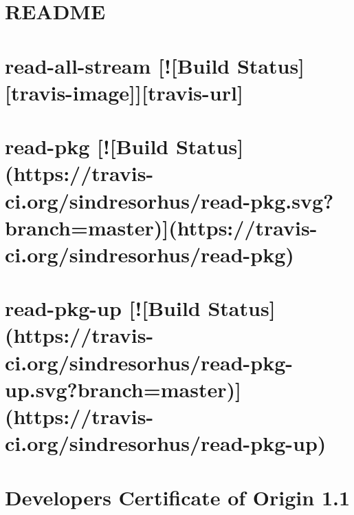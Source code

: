 \documentclass[twoside]{book}
\newcommand{\+}{\discretionary{\mbox{\scriptsize$\hookleftarrow$}}{}{}}
\begin{document}
\chapter{R\+E\+A\+D\+ME}
\label{md__c_1_workspace_demo_src_main_script_node_modules_react-scripts_template__r_e_a_d_m_e}

\chapter{read-\/all-\/stream \mbox{[}!\mbox{[}Build Status\mbox{]}\mbox{[}travis-\/image\mbox{]}\mbox{]}\mbox{[}travis-\/url\mbox{]}}
\label{md__c_1_workspace_demo_src_main_script_node_modules_read-all-stream_readme}

\chapter{read-\/pkg \mbox{[}!\mbox{[}Build Status\mbox{]}(https\+://travis-\/ci.org/sindresorhus/read-\/pkg.svg?branch=master)\mbox{]}(https\+://travis-\/ci.org/sindresorhus/read-\/pkg)}
\label{md__c_1_workspace_demo_src_main_script_node_modules_read-pkg_readme}

\chapter{read-\/pkg-\/up \mbox{[}!\mbox{[}Build Status\mbox{]}(https\+://travis-\/ci.org/sindresorhus/read-\/pkg-\/up.svg?branch=master)\mbox{]}(https\+://travis-\/ci.org/sindresorhus/read-\/pkg-\/up)}
\label{md__c_1_workspace_demo_src_main_script_node_modules_read-pkg-up_readme}

\chapter{Developer\textquotesingle{}s Certificate of Origin 1.1}
\label{md__c_1_workspace_demo_src_main_script_node_modules_readable-stream__c_o_n_t_r_i_b_u_t_i_n_g}

\end{document}
